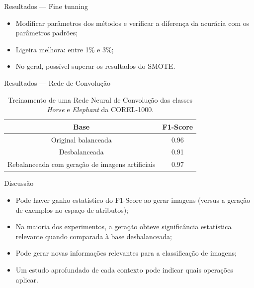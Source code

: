 \documentclass{beamer}
\begin{document}
\begin{frame}{Resultados --- Fine tunning}
  \setlength\leftmargini{1em}
  \begin{itemize}
    \item Modificar parâmetros dos métodos e verificar a diferença da acurácia com os parâmetros padrões;
    \item Ligeira melhora: entre 1\% e 3\%;
    \item No geral, possível superar os resultados do SMOTE.
  \end{itemize}
\end{frame}
\begin{frame}{Resultados --- Rede de Convolução}
  \setlength\leftmargini{1em}
  \begin{table}
    \caption{Treinamento de uma Rede Neural de Convolução das classes \textit{Horse} e \textit{Elephant} da COREL-1000.}
    \begin{tabular}{c|c}
      Base    &   F1-Score \\ \hline
      Original balanceada     &   0.96  \\
      Desbalanceada           &   0.91  \\
      Rebalanceada com geração de imagens artificiais &  0.97  \\
    \end{tabular}
  \end{table}
\end{frame}
\begin{frame}{Discussão}
  \setlength\leftmargini{1em}
  \begin{itemize}
    \item Pode haver ganho estatístico do F1-Score ao gerar imagens (versus a geração de exemplos no espaço de atributos);
    \item Na maioria dos experimentos, a geração obteve significância estatística relevante quando comparada à base desbalanceada;
    \item Pode gerar novas informações relevantes para a classificação de imagens;
    \item Um estudo aprofundado de cada contexto pode indicar quais operações aplicar.
  \end{itemize}
\end{frame}
\end{document}
